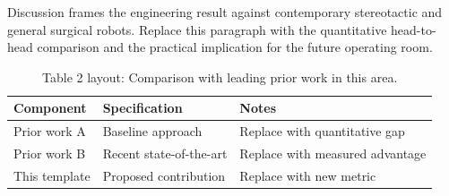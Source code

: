 
Discussion frames the engineering result against contemporary stereotactic and general surgical robots. Replace this paragraph with the quantitative head-to-head comparison and the practical implication for the future operating room.

\begin{table}[H]
\caption{Table 2 layout: Comparison with leading prior work in this area.}
\label{tab:discussion_compare}
\centering
\begin{tabular}{>{\raggedright\arraybackslash}p{3.4cm} >{\raggedright\arraybackslash}p{4.6cm} >{\raggedright\arraybackslash}p{5.4cm}}
\toprule
\textbf{Component} & \textbf{Specification} & \textbf{Notes} \\
\midrule
  Prior work A & Baseline approach & Replace with quantitative gap \\
  Prior work B & Recent state-of-the-art & Replace with measured advantage \\
  This template & Proposed contribution & Replace with new metric \\
\bottomrule
\end{tabular}
\end{table}
